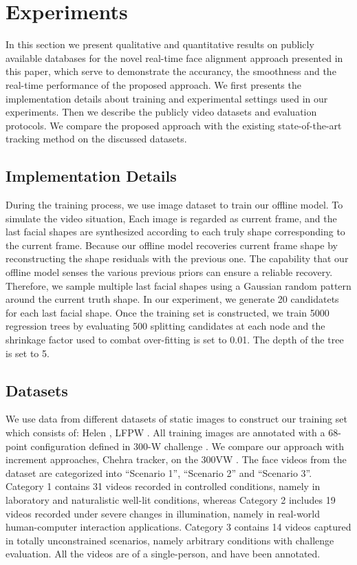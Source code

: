\documentclass[a4paper, 10pt, conference]{ieeeconf}      %
\begin{document}
\section{Experiments}
In this section we present qualitative and quantitative results on publicly available databases for the novel real-time face alignment 
approach presented in this paper, which serve to demonstrate the accurancy, the smoothness and the real-time performance of the proposed approach. 
We first presents the implementation details about training and experimental settings used in our experiments. Then we describe the publicly video
datasets and evaluation protocols. We compare the proposed approach with the existing state-of-the-art tracking method on the discussed datasets. 
\subsection{Implementation Details}
During the training process, we use image dataset to train our offline model. To simulate the video situation, Each image is regarded as 
current frame, and the last facial shapes are synthesized according to each truly shape corresponding to the current frame. 
Because our offline model recoveries current frame shape by reconstructing the shape residuals with the previous one. The capability that our 
offline model senses the various previous priors can ensure a reliable recovery. Therefore, we sample multiple last facial shapes using a Gaussian 
random pattern around the current truth shape. In our experiment, we generate 20 candidatets for each last facial shape. Once the training 
set is constructed, we train 5000 regression trees by evaluating 500 splitting candidates at each node and the shrinkage factor used
to combat over-fitting is set to 0.01. The depth of the tree is set to 5.
\subsection{Datasets}
We use data from different datasets of static images to construct our training set which consists of: Helen \cite{le2012interactive},
LFPW \cite{belhumeur2013localizing}.
All training images are annotated with a 68-point configuration defined in 300-W challenge \cite{sagonas2013semi}. We compare our approach 
with increment approaches, Chehra tracker, on the 300VW \cite{shen2015first}. The face videos from the dataset are categorized into “Scenario 1”, 
“Scenario 2” and “Scenario 3”. 
Category 1 contains 31 videos recorded in controlled conditions, namely in laboratory and naturalistic well-lit conditions, 
whereas Category 2 includes 19 videos recorded under severe changes in illumination, namely in real-world human-computer interaction applications. 
Category 3 contains 14 videos captured in totally unconstrained scenarios, namely arbitrary conditions with challenge evaluation. 
All the videos are of a single-person, and have been annotated.
\end{document}
